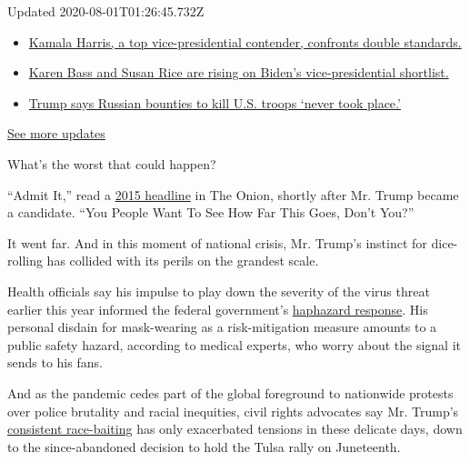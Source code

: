 Updated 2020-08-01T01:26:45.732Z

\begin{itemize}
\tightlist
\item
  \href{https://www.nytimes.com/2020/07/31/us/elections/biden-vs-trump.html?action=click\&pgtype=Article\&state=default\&region=MAIN_CONTENT_1\&context=storylines_live_updates\#link-29fdff45}{Kamala
  Harris, a top vice-presidential contender, confronts double
  standards.}
\item
  \href{https://www.nytimes.com/2020/07/31/us/elections/biden-vs-trump.html?action=click\&pgtype=Article\&state=default\&region=MAIN_CONTENT_1\&context=storylines_live_updates\#link-13ec3d9c}{Karen
  Bass and Susan Rice are rising on Biden's vice-presidential
  shortlist.}
\item
  \href{https://www.nytimes.com/2020/07/31/us/elections/biden-vs-trump.html?action=click\&pgtype=Article\&state=default\&region=MAIN_CONTENT_1\&context=storylines_live_updates\#link-49e9a016}{Trump
  says Russian bounties to kill U.S. troops `never took place.'}
\end{itemize}

\href{https://www.nytimes.com/2020/07/31/us/elections/biden-vs-trump.html?action=click\&pgtype=Article\&state=default\&region=MAIN_CONTENT_1\&context=storylines_live_updates}{See
more updates}

What's the worst that could happen?

``Admit It,'' read a
\href{https://www.theonion.com/admit-it-you-people-want-to-see-how-far-this-goes-don-1819584988}{2015
headline} in The Onion, shortly after Mr. Trump became a candidate.
``You People Want To See How Far This Goes, Don't You?''

It went far. And in this moment of national crisis, Mr. Trump's instinct
for dice-rolling has collided with its perils on the grandest scale.

Health officials say his impulse to play down the severity of the virus
threat earlier this year informed the federal government's
\href{https://www.nytimes.com/2020/06/03/us/cdc-coronavirus.html}{haphazard
response}. His personal disdain for mask-wearing as a risk-mitigation
measure amounts to a public safety hazard, according to medical experts,
who worry about the signal it sends to his fans.

And as the pandemic cedes part of the global foreground to nationwide
protests over police brutality and racial inequities, civil rights
advocates say Mr. Trump's
\href{https://www.nytimes.com/2020/06/11/us/politics/trump-on-race.html}{consistent
race-baiting} has only exacerbated tensions in these delicate days, down
to the since-abandoned decision to hold the Tulsa rally on Juneteenth.


